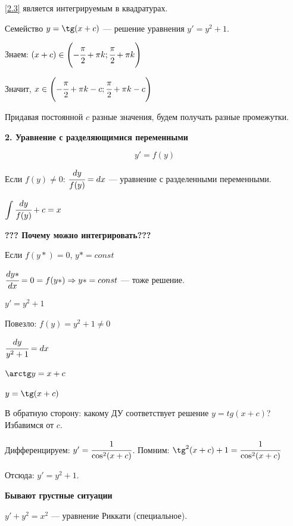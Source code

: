 \ref{2.3} является интегрируемым в квадратурах.

\begin{example}
    Семейство $y = \tg(x + c)$ --- решение уравнения $y' = y^2 + 1$.
    
    Знаем: $\left({x + c}\right) \in \left({-\cfrac{\pi}{2} + \pi k; \cfrac{\pi}{2} + \pi k}\right)$
    
    Значит, $x \in \left({-\cfrac{\pi}{2} + \pi k - c; \cfrac{\pi}{2} + \pi k - c}\right)$
    
    Придавая постоянной $c$ разные значения, будем получать разные промежутки.
\end{example}
\vspace{4mm}

\begin{center}
\textbf{\large{2. Уравнение с разделяющимися переменными}}
\end{center}
\begin{equation}\label{2.4}
    y' = f(y)
\end{equation}

Если $f(y) \neq 0$: $\cfrac{dy}{f(y)} = dx$ --- уравнение с разделенными переменными.

$\displaystyle \int\cfrac{dy}{f(y)} + c = x$

\textbf{??? Почему можно интегрировать???}

Если $f(y*) = 0$, $y* = const$

$\cfrac{dy*}{dx} = 0 = f(y*) \Rightarrow y* = const$ --- тоже решение.

\begin{example}
    $y' = y^2 + 1$
    
    Повезло: $f(y) = y^2 + 1 \neq 0$
    
    $\cfrac{dy}{y^2 + 1} = dx$
    
    $\arctg y = x + c$
    
    $y = \tg (x + c)$
    
    В обратную сторону: какому ДУ соответствует решение $y = tg(x + c)$? Избавимся от $c$.
    
    Дифференцируем: $y' = \cfrac{1}{\cos^2(x + c)}$. Помним: $\tg^2(x + c) + 1 = \cfrac{1}{\cos^2(x + c)}$
    
    Отсюда: $y' = y^2 + 1$.
\end{example}
\vspace{3mm}

\textbf{Бывают грустные ситуации \Frowny}

$y' + y^2 = x^2$ --- уравнение Риккати (специальное).

